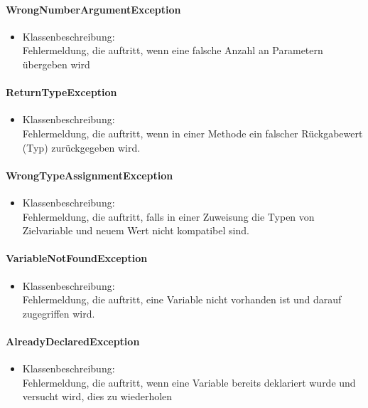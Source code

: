 \documentclass[parskip=full]{scrartcl}
\begin{document}
\paragraph{WrongNumberArgumentException}
\begin{itemize}
\item Klassenbeschreibung: \\
Fehlermeldung, die auftritt, wenn eine falsche Anzahl an Parametern übergeben wird
\end{itemize}

\paragraph{ReturnTypeException}
\begin{itemize}
\item Klassenbeschreibung: \\
Fehlermeldung, die auftritt, wenn in einer Methode ein falscher Rückgabewert (Typ) zurückgegeben wird.
\end{itemize}

\paragraph{WrongTypeAssignmentException}
\begin{itemize}
\item Klassenbeschreibung: \\
Fehlermeldung, die auftritt, falls in einer Zuweisung die Typen von Zielvariable und neuem Wert nicht kompatibel sind.
\end{itemize}
\paragraph{VariableNotFoundException}
\begin{itemize}
\item Klassenbeschreibung: \\
Fehlermeldung, die auftritt, eine Variable nicht vorhanden ist und darauf zugegriffen wird.
\end{itemize}

\paragraph{AlreadyDeclaredException}
\begin{itemize}
\item Klassenbeschreibung: \\
Fehlermeldung, die auftritt, wenn eine Variable bereits deklariert wurde und versucht wird, dies zu wiederholen
\end{itemize}
\end{document}
